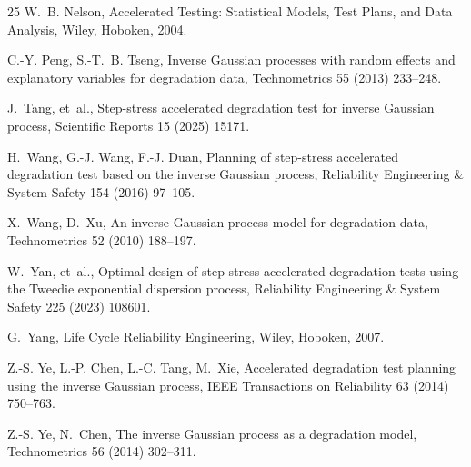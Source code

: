 \documentclass[11pt]{article}
\begin{document}
\begin{thebibliography}{25}
W.~B. Nelson, Accelerated Testing: Statistical Models, Test Plans, and Data Analysis, Wiley,
Hoboken, 2004.

C.-Y. Peng, S.-T.~B. Tseng, Inverse Gaussian processes with random effects and explanatory
variables for degradation data, Technometrics 55 (2013) 233--248.

J.~Tang, et~al., Step-stress accelerated degradation test for inverse Gaussian process,
Scientific Reports 15 (2025) 15171.

H.~Wang, G.-J. Wang, F.-J. Duan, Planning of step-stress accelerated degradation test based on
the inverse Gaussian process, Reliability Engineering \& System Safety 154 (2016) 97--105.

X.~Wang, D.~Xu, An inverse Gaussian process model for degradation data, Technometrics 52
(2010) 188--197.

W.~Yan, et~al., Optimal design of step-stress accelerated degradation tests using the Tweedie
exponential dispersion process, Reliability Engineering \& System Safety 225 (2023) 108601.

G.~Yang, Life Cycle Reliability Engineering, Wiley, Hoboken, 2007.

Z.-S. Ye, L.-P. Chen, L.-C. Tang, M.~Xie, Accelerated degradation test planning using the
inverse Gaussian process, IEEE Transactions on Reliability 63 (2014) 750--763.

Z.-S. Ye, N.~Chen, The inverse Gaussian process as a degradation model, Technometrics 56
(2014) 302--311.

\end{thebibliography}
\end{document}
